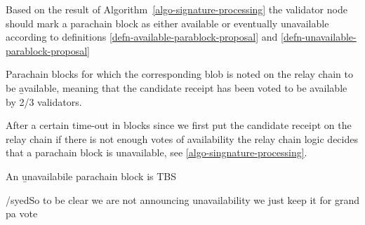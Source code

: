Based on the result of Algorithm~\ref{algo-signature-processing} the validator
node should mark a parachain block as either available or eventually unavailable
according to definitions \ref{defn-available-parablock-proposal} and
\ref{defn-unavailable-parablock-proposal}
\begin{definition}
  \label{defn-available-parablock-proposal}
        Parachain blocks for which the corresponding blob is  noted on the relay
        chain to be {\b available}, meaning that the candidate receipt has been
        voted to be available by 2/3 validators.
\end{definition}

After a certain time-out in blocks since we first put the candidate receipt on
the relay chain if there is not enough votes of availability the relay chain
logic decides that a parachain block is unavailable, see
\ref{algo-singnature-processing}.

\begin{definition}
  \label{defn-unavailable-parachain-block}
       An {\b unavailabile parachain block} is TBS
\end{definition}

/syed{}{So to be clear we are not announcing unavailability we just keep it for
grand pa vote}